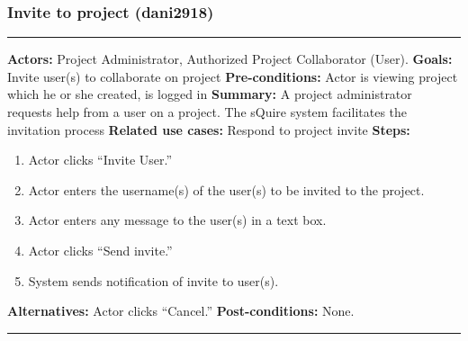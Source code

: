 \documentclass[11pt]{report}
\begin{document}
\subsubsection{Invite to project (dani2918)}
\vspace{2pt}
\hrule
\vspace{8pt}
 \textbf{Actors:} Project Administrator, Authorized Project Collaborator (User).  \newline
\textbf{Goals:} Invite user(s) to collaborate on project \newline
 \textbf{Pre-conditions:} Actor is viewing project which he or she created, is logged in   \newline
\textbf{Summary:} A project administrator requests help from a user on a project. The sQuire system facilitates the invitation process  \newline
\textbf{Related use cases:} Respond to project invite\newline
\textbf{Steps:} \begin{enumerate}
  \item Actor clicks ``Invite User.''
  \item Actor enters the username(s) of the user(s) to be invited to the project.
  \item Actor enters any message to the user(s) in a text box.
  \item Actor clicks ``Send invite.''
  \item System sends notification of invite to user(s).
 \end{enumerate}
 \textbf{Alternatives:} Actor clicks ``Cancel.''
 \textbf{Post-conditions:} None.  \newline
\vspace{8pt}
\hrule
\newpage
\end{document}
